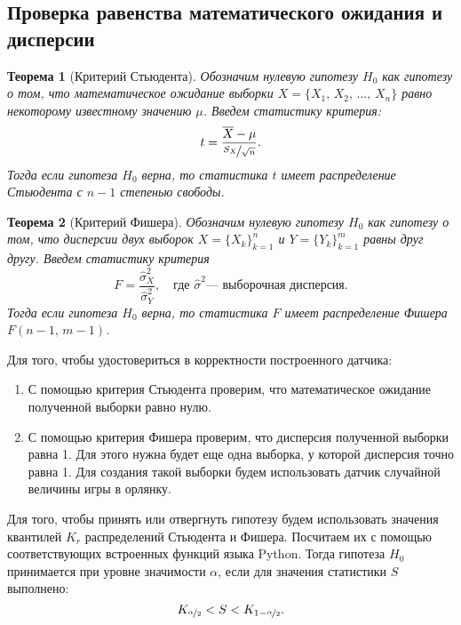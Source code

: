 \documentclass[a4paper, 11pt]{article}
\theoremstyle{def}
\theoremstyle{th}
\newtheorem{theorem}{Теорема}[section]
\theoremstyle{rem}
\begin{document}
\subsection{Проверка равенства математического ожидания и дисперсии}
\begin{theorem}[Критерий Стьюдента]
        Обозначим нулевую гипотезу $H_0$ как гипотезу о том, что математическое ожидание выборки $X = \{X_1,\,X_2,\,\ldots,\,X_n\}$ равно некоторому известному значению $\mu$. Введем статистику критерия:
$$
        t = \frac{\overline{X} - \mu}{\nicefrac{S_X}{\sqrt{n}}}.
$$
        Тогда если гипотеза $H_0$ верна, то статистика $t$ имеет распределение Стьюдента с $n-1$ степенью свободы.
\end{theorem}

\begin{theorem}[Критерий Фишера]
        Обозначим нулевую гипотезу $H_0$ как гипотезу о том, что дисперсии двух выборок $X = \{X_k\}_{k=1}^n$ и $Y = \{Y_k\}_{k=1}^m$ равны друг другу. Введем статистику критерия
$$
        F = \frac{\hat \sigma_X^2}{\hat\sigma_Y^2},
        \quad
        \mbox{где }
        \hat\sigma^2
        \mbox{--- выборочная дисперсия}.
$$
        Тогда если гипотеза $H_0$ верна, то статистика $F$ имеет распределение Фишера $F(n-1,\,m-1)$.
\end{theorem}
Для того, чтобы удостовериться в корректности построенного датчика:
\begin{enumerate}
    \item С помощью критерия Стьюдента проверим, что математическое ожидание полученной выборки равно нулю.
    \item С помощью критерия Фишера проверим, что дисперсия полученной выборки равна 1. Для этого нужна будет еще одна выборка, у которой дисперсия точно равна 1. Для создания такой выборки будем использовать датчик случайной величины игры в орлянку.  
\end{enumerate}
Для того, чтобы принять или отвергнуть гипотезу будем использовать значения квантилей $K_r$ распределений Стьюдента и Фишера. Посчитаем их с помощью соответствующих встроенных функций языка Python. Тогда гипотеза $H_0$ принимается при уровне значимости $\alpha$, если для значения статистики $S$ выполнено:
$$
K_{\nicefrac{\alpha}{2}} < S < K_{1 - \nicefrac{\alpha}{2}}.
$$
\end{document}
